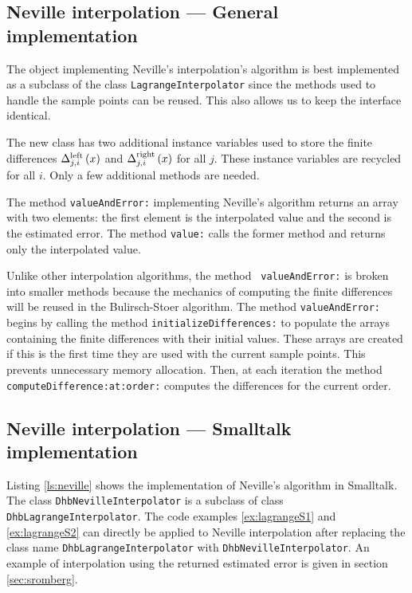 \documentclass[twoside]{book}
\begin{document}
\subsection{ Neville interpolation --- General  implementation}
 The object implementing Neville's
interpolation's algorithm is best implemented as a subclass of the
class {\tt LagrangeInterpolator} since the methods used to handle
the sample points can be reused. This also allows us to keep the
interface identical.

The new class has two additional instance variables used to store
the finite differences $\Delta_{j,i}^{\mathop{\rm
left}}\left(x\right)$ and $\Delta_{j,i}^{\mathop{\rm
right}}\left(x\right)$ for all $j$. These instance variables are
recycled for all $i$. Only a few additional methods are needed.

The method {\tt valueAndError:} implementing Neville's algorithm
returns an array with two elements: the first element is the
interpolated value and the second is the estimated error. The
method {\tt value:} calls the former method and returns only the
interpolated value.

Unlike other interpolation algorithms, the method {\tt
valueAndError:} is broken into smaller methods because the
mechanics of computing the finite differences will be reused in
the Bulirsch-Stoer algorithm. The method {\tt valueAndError:}
begins by calling the method {\tt initializeDifferences:} to
populate the arrays containing the finite differences with their
initial values. These arrays are created if this is the first time
they are used with the current sample points. This prevents
unnecessary memory allocation. Then, at each iteration the method
{\tt computeDifference:at:order:} computes the differences for the
current order.

\subsection{ Neville interpolation --- Smalltalk  implementation}
Listing \ref{ls:neville} shows the implementation of Neville's
algorithm in Smalltalk. The class {\tt DhbNevilleInterpolator} is
a subclass of class {\tt DhbLagrangeInterpolator}. The code
examples \ref{ex:lagrangeS1} and \ref{ex:lagrangeS2} can directly
be applied to Neville interpolation after replacing the class name
{\tt DhbLagrangeInterpolator} with {\tt DhbNevilleInterpolator}.
An example of interpolation using the returned estimated error is
given in section \ref{sec:sromberg}.
\end{document}
